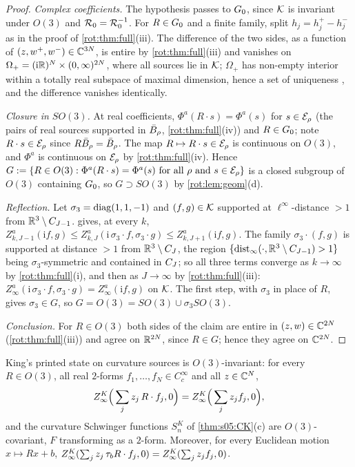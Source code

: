 \begin{proof}
\emph{Complex coefficients.} The hypothesis passes to $G_0$, since $\mathcal K$ is invariant under $O(3)$ and $\mathcal R_0=\mathcal R_0^{-1}$. For
$R\in G_0$ and a finite family, split $h_j=h^+_j-h^-_j$ as in the proof of \cref{rot:thm:full}(iii). The difference of the two sides, as a
function of $(z,w^+,w^-)\in\mathbb C^{3N}$, is entire by \cref{rot:thm:full}(iii) and vanishes on
$\Omega_+=(\mathrm i\mathbb R)^N\times(0,\infty)^{2N}$, where all sources lie in $\mathcal K$; $\Omega_+$ has non-empty interior within a totally
real subspace of maximal dimension, hence a set of uniqueness \cite{Hor90}, and the difference vanishes identically.

\emph{Closure in $SO(3)$.} At real coefficients, $\Phi^a(R\cdot s)=\Phi^a(s)$ for $s\in\mathcal E_\rho$ (the pairs of real sources supported
in $\bar B_{\rho}$, \cref{rot:thm:full}(iv)) and $R\in G_0$; note $R\cdot s\in\mathcal E_\rho$ since $R\bar B_{\rho}=\bar B_{\rho}$. The map
$R\mapsto R\cdot s\in\mathcal E_\rho$ is continuous on $O(3)$, and $\Phi^a$ is continuous on $\mathcal E_\rho$ by \cref{rot:thm:full}(iv). Hence
$G:=\{R\in O(3):\Phi^a(R\cdot s)=\Phi^a(s)\text{ for all }\rho\text{ and }s\in\mathcal E_\rho\}$ is a closed subgroup of $O(3)$ containing
$G_0$, so $G\supset SO(3)$ by \cref{rot:lem:geom}(d).

\emph{Reflection.} Let $\sigma_3=\operatorname{diag}(1,1,-1)$ and $(f,g)\in\mathcal K$ supported at $\ell^\infty$-distance $>1$ from
$\mathbb R^3\setminus C_{J-1}$.  gives, at every $k$,
$Z^a_{k,J-1}(\mathrm if,g)\le Z^a_{k,J}(\mathrm i\,\sigma_3\cdot f,\sigma_3\cdot g)\le Z^a_{k,J+1}(\mathrm if,g)$. The family
$\sigma_3\cdot(f,g)$ is supported at distance $>1$ from $\mathbb R^3\setminus C_J$, the region $\{\operatorname{dist}_\infty(\cdot,\mathbb R^3\setminus C_{J-1})>1\}$
being $\sigma_3$-symmetric and contained in $C_J$; so all three terms converge as $k\to\infty$ by \cref{rot:thm:full}(i), and then as
$J\to\infty$ by \cref{rot:thm:full}(iii): $Z^a_\infty(\mathrm i\,\sigma_3\cdot f,\sigma_3\cdot g)=Z^a_\infty(\mathrm if,g)$ on $\mathcal K$. The
first step, with $\sigma_3$ in place of $R$, gives $\sigma_3\in G$, so $G=O(3)=SO(3)\cup\sigma_3SO(3)$.

\emph{Conclusion.} For $R\in O(3)$ both sides of the claim are entire in $(z,w)\in\mathbb C^{2N}$ (\cref{rot:thm:full}(iii)) and agree on
$\mathbb R^{2N}$, since $R\in G$; hence they agree on $\mathbb C^{2N}$.
\end{proof}

\begin{theorem}\label{rot:thm:curv}
King's printed state on curvature sources is
$O(3)$-invariant: for every $R\in O(3)$, all real $2$-forms $f_1,\dots,f_N\in C^\infty_c$ and all $z\in\mathbb C^N$,
\[
Z^{K}_{\infty}\Big(\sum_jz_j\,R\cdot f_j,0\Big)=Z^{K}_{\infty}\Big(\sum_jz_jf_j,0\Big),
\]
and the curvature Schwinger functions $S^K_n$ of \cref{thm:s05:CK}(c) are $O(3)$-covariant, $F$ transforming as a $2$-form. Moreover,
for every Euclidean motion $x\mapsto Rx+b$, $Z^{K}_{\infty}(\sum_jz_j\,\tau_bR\cdot f_j,0)=Z^{K}_{\infty}(\sum_jz_jf_j,0)$.
\end{theorem}

